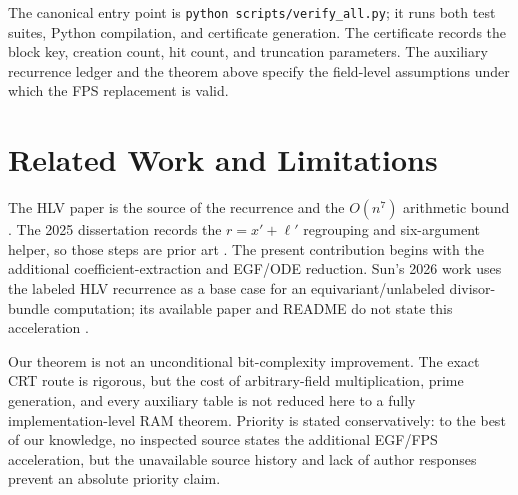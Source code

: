\documentclass[10pt]{article}
\begin{document}
The canonical entry point is \texttt{python scripts/verify\_all.py}; it runs both test suites, Python compilation, and certificate generation. The certificate records the block key, creation count, hit count, and truncation parameters. The auxiliary recurrence ledger and the theorem above specify the field-level assumptions under which the FPS replacement is valid.

\section{Related Work and Limitations}
The HLV paper is the source of the recurrence and the $O(n^7)$ arithmetic bound \cite{hlv}. The 2025 dissertation records the $r=x'+\ell'$ regrouping and six-argument helper, so those steps are prior art \cite{dissertation}. The present contribution begins with the additional coefficient-extraction and EGF/ODE reduction. Sun's 2026 work uses the labeled HLV recurrence as a base case for an equivariant/unlabeled divisor-bundle computation; its available paper and README do not state this acceleration \cite{sun}.

Our theorem is not an unconditional bit-complexity improvement. The exact CRT route is rigorous, but the cost of arbitrary-field multiplication, prime generation, and every auxiliary table is not reduced here to a fully implementation-level RAM theorem. Priority is stated conservatively: to the best of our knowledge, no inspected source states the additional EGF/FPS acceleration, but the unavailable source history and lack of author responses prevent an absolute priority claim.
\end{document}
